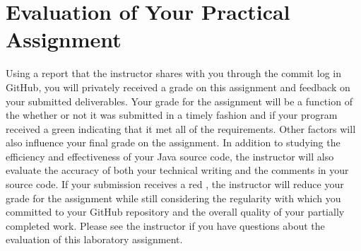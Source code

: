\documentclass[11pt]{article}
\newcommand{\checkmark}{\ding{51}}
\newcommand{\naughtmark}{\ding{55}}
\begin{document}
\section*{Evaluation of Your Practical Assignment}

Using a report that the instructor shares with you through the commit log in GitHub, you will privately received a grade
on this assignment and feedback on your submitted deliverables. Your grade for the assignment will be a function of the
whether or not it was submitted in a timely fashion and if your program received a green \checkmark{} indicating that it
met all of the requirements. Other factors will also influence your final grade on the assignment. In addition to
studying the efficiency and effectiveness of your Java source code, the instructor will also evaluate the accuracy of
both your technical writing and the comments in your source code. If your submission receives a red \naughtmark{}, the
instructor will reduce your grade for the assignment while still considering the regularity with which you committed to
your GitHub repository and the overall quality of your partially completed work. Please see the instructor if you have
questions about the evaluation of this laboratory assignment.
\end{document}
